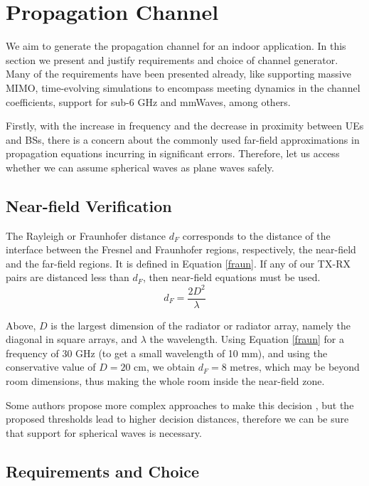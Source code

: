 \section{Propagation Channel}
\label{sec:radio_channel}

We aim to generate the propagation channel for an indoor application. In this section we present and justify requirements and choice of channel generator. Many of the requirements have been presented already, like supporting massive MIMO, time-evolving simulations to encompass meeting dynamics in the channel coefficients, support for sub-6 GHz and \acsp{mmWave}, among others.

Firstly, with the increase in frequency and the decrease in proximity between \acsp{UE} and \acsp{BS}, there is a concern about the commonly used far-field approximations in propagation equations incurring in significant errors. Therefore, let us access whether we can assume spherical waves as plane waves safely.


\subsection*{Near-field Verification}
The Rayleigh or Fraunhofer distance $d_F$ corresponds to the distance of the interface between the Fresnel and Fraunhofer regions, respectively, the near-field and the far-field regions. It is defined in Equation \eqref{fraun}. If any of our TX-RX pairs are distanced less than $d_F$, then near-field equations must be used.
\begin{equation} \label{fraun}
    d_F = \frac{2 D^2}{\lambda}
\end{equation} 

Above, $D$ is the largest dimension of the radiator or radiator array, namely the diagonal in square arrays, and $\lambda$ the wavelength. Using Equation \ref{fraun} for a frequency of 30 GHz (to get a small wavelength of 10 mm), and using the conservative value of $D = 20 $ cm, we obtain $d_{F} = 8 $ metres, which may be beyond room dimensions, thus making the whole room inside the near-field zone. 

Some authors propose more complex approaches to make this decision \cite{4799060}, but the proposed thresholds lead to higher decision distances, therefore we can be sure that support for spherical waves is necessary.


\subsection*{Requirements and Choice}

